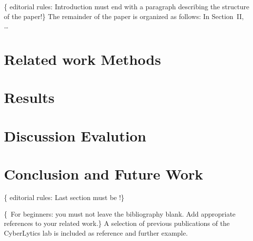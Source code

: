 \documentclass[conference,flushend]{iaria-lite}
\begin{document}
\lipsum[12]

\{\faWarning{}  editorial rules: Introduction must end with a paragraph describing the structure of the paper!\}
The remainder of the paper is organized as follows: In Section~II, …

\section{Related work \textbar{} Methods}
\lipsum[13]

\section{Results}
\lipsum[14]

\section{Discussion \textbar{} Evalution}
\lipsum[15]

\section{Conclusion and Future Work}
\{\faWarning{}  editorial rules: Last section must be !\}
\lipsum[16]

\{\,\faWarning{} For beginners: you must not leave the bibliography blank. Add appropriate references to your related work.\}
%
A selection of previous   publications of the CyberLytics lab
%
%
\cite{%
StNe25kosmosisGraphConstruction,%
LeNe24goalHijackingLLMs,%
LeNe24vocattllm,%
PANP23seccloudfogai,%
StNe23foodfresh}
%
%
is included as reference and further example.

\printbibliography
\end{document}
